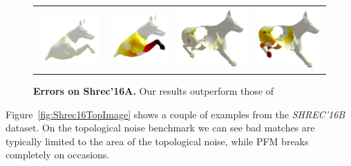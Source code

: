 \documentclass[10pt,twocolumn,letterpaper]{article}
\begin{document}
\begin{figure}[htb]
\begin{tabular}[width=0.8\textwidth]{cc|cc}
		\includegraphics[scale=0.5]{figures/cuts_dog_8_err.png} & \includegraphics[scale=0.5]{figures/cuts_dog_8_err_PFM.png} &  \includegraphics[scale=0.5]{figures/holes_dog_13_err.png} &  \includegraphics[scale=0.5]{figures/holes_dog_13_PFM_err.png}\\
	\end{tabular}
	\caption{{\bf Errors on Shrec'16A.} 
		Our results outperform those of~\cite{rodola2017partial}
	}
	\label{fig:Shrec16Qualitative-error}
\end{figure}
Figure~\ref{fig:Shrec16TopImage} shows a couple of examples from the {\em SHREC'16B} dataset.
On the topological noise benchmark we can see bad matches are typically limited to the area of the topological noise, while PFM breaks completely on occasions.
\end{document}
